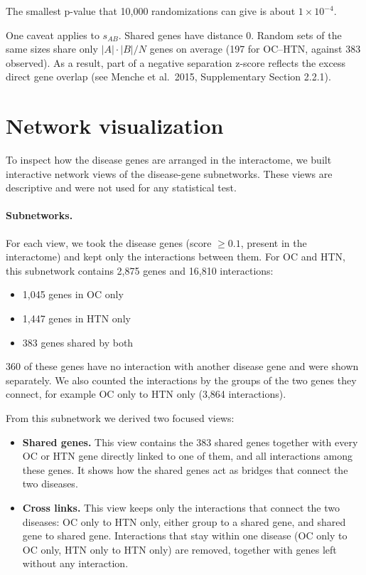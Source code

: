 \documentclass[11pt]{article}
\begin{document}
The smallest p-value that 10,000 randomizations can give is about $1 \times 10^{-4}$.

One caveat applies to $s_{AB}$. Shared genes have distance 0. Random sets of the same sizes share only $|A|\cdot|B|/N$ genes on average (197 for OC--HTN, against 383 observed). As a result, part of a negative separation z-score reflects the excess direct gene overlap (see Menche et al.\ 2015, Supplementary Section 2.2.1).

\section{Network visualization}

To inspect how the disease genes are arranged in the interactome, we built interactive network views of the disease-gene subnetworks. These views are descriptive and were not used for any statistical test.

\paragraph{Subnetworks.} For each view, we took the disease genes (score $\ge 0.1$, present in the interactome) and kept only the interactions between them. For OC and HTN, this subnetwork contains 2,875 genes and 16,810 interactions:

\begin{itemize}
  \item 1,045 genes in OC only
  \item 1,447 genes in HTN only
  \item 383 genes shared by both
\end{itemize}

360 of these genes have no interaction with another disease gene and were shown separately. We also counted the interactions by the groups of the two genes they connect, for example OC only to HTN only (3,864 interactions).

From this subnetwork we derived two focused views:

\begin{itemize}
  \item \textbf{Shared genes.} This view contains the 383 shared genes together with every OC or HTN gene directly linked to one of them, and all interactions among these genes. It shows how the shared genes act as bridges that connect the two diseases.
  \item \textbf{Cross links.} This view keeps only the interactions that connect the two diseases: OC only to HTN only, either group to a shared gene, and shared gene to shared gene. Interactions that stay within one disease (OC only to OC only, HTN only to HTN only) are removed, together with genes left without any interaction.
\end{itemize}
\end{document}
